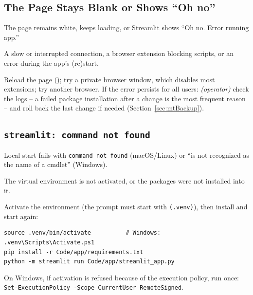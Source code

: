 \subsection{The Page Stays Blank or Shows ``Oh no''}
\label{sec:tsBlank}

\begin{description}[style=nextline,leftmargin=0.5cm,font=\normalfont\bfseries]
  \item[Symptom] The page remains white, keeps loading, or Streamlit shows ``Oh no. Error running app.''
  \item[Cause] A slow or interrupted connection, a browser extension blocking scripts, or an error during the app's (re)start.
  \item[Solution] Reload the page (); try a private browser window, which disables most extensions; try another browser. If the error persists for all users: \emph{(operator)} check the logs -- a failed package installation after a change is the most frequent reason -- and roll back the last change if needed (Section~\ref{sec:mtBackup}).
\end{description}

\subsection{\texttt{streamlit: command not found}}
\label{sec:tsCommand}

\begin{description}[style=nextline,leftmargin=0.5cm,font=\normalfont\bfseries]
  \item[Symptom] Local start fails with \texttt{command not found} (macOS/Linux) or ``is not recognized as the name of a cmdlet'' (Windows).
  \item[Cause] The virtual environment is not activated, or the packages were not installed into it.
  \item[Solution] Activate the environment (the prompt must start with \texttt{(.venv)}), then install and start again:
\begin{lstlisting}[style=shell]
source .venv/bin/activate          # Windows: .venv\Scripts\Activate.ps1
pip install -r Code/app/requirements.txt
python -m streamlit run Code/app/streamlit_app.py
\end{lstlisting}
  On Windows, if activation is refused because of the execution policy, run once: \texttt{Set-ExecutionPolicy -Scope CurrentUser RemoteSigned}.
\end{description}

